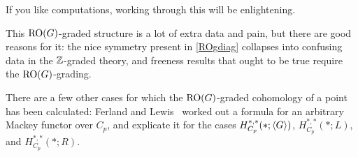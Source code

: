 If you like computations, working through this will be enlightening.
\begin{rem}
This $\mathrm{RO}(G)$-graded structure is a lot of extra data and pain, but there are good reasons for it: the nice
symmetry present in \cref{ROgdiag} collapses into confusing data in the $\mathbb Z$-graded theory, and freeness results
that ought to be true require the $\mathrm{RO}(G)$-grading.
\end{rem}
There are a few other cases for which the $\mathrm{RO}(G)$-graded cohomology of a point has been calculated: Ferland and
Lewis~\cite{FerlandLewis} worked out a formula for an arbitrary Mackey functor over $C_p$, and explicate it for the
cases $H_{C_p}^{*,*}(*; \langle G\rangle)$, $H_{C_p}^{*,*}(*; L)$, and $H_{C_p}^{*,*}(*; R)$.
